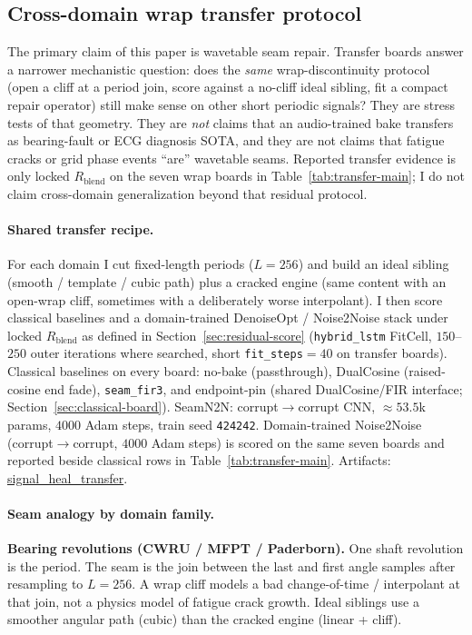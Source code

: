 
\subsection{Cross-domain wrap transfer protocol}
\label{sec:transfer-protocol}

The primary claim of this paper is wavetable seam repair.
Transfer boards answer a narrower mechanistic question:
does the \emph{same} wrap-discontinuity protocol (open a cliff at a period join, score against a no-cliff ideal sibling, fit a compact repair operator) still make sense on other short periodic signals?
They are stress tests of that geometry.
They are \emph{not} claims that an audio-trained bake transfers as bearing-fault or ECG diagnosis SOTA,
and they are not claims that fatigue cracks or grid phase events ``are'' wavetable seams.
Reported transfer evidence is only locked $R_{\mathrm{blend}}$ on the seven wrap boards in Table~\ref{tab:transfer-main}; I do not claim cross-domain generalization beyond that residual protocol.

\paragraph{Shared transfer recipe.}
For each domain I cut fixed-length periods ($L{=}256$) and build an ideal sibling (smooth / template / cubic path) plus a cracked engine (same content with an open-wrap cliff, sometimes with a deliberately worse interpolant).
I then score classical baselines and a domain-trained DenoiseOpt / Noise2Noise stack under locked $R_{\mathrm{blend}}$ as defined in Section~\ref{sec:residual-score}
(\texttt{hybrid\_lstm} FitCell, $150$--$250$ outer iterations where searched, short \texttt{fit\_steps}${}={}40$ on transfer boards).
Classical baselines on every board: no-bake (passthrough), DualCosine (raised-cosine end fade), \texttt{seam\_fir3}, and endpoint-pin (shared DualCosine/FIR interface; Section~\ref{sec:classical-board}).
SeamN2N: corrupt$\to$corrupt CNN, ${\approx}53.5$k params, $4000$ Adam steps, train seed \texttt{424242}.
Domain-trained Noise2Noise (corrupt$\to$corrupt, $4000$ Adam steps) is scored on the same seven boards and reported beside classical rows in Table~\ref{tab:transfer-main}.
Artifacts:
\href{https://github.com/reeldemo/denoise-opt}{signal\_heal\_transfer}.

\paragraph{Seam analogy by domain family.}
\textbf{Bearing revolutions (CWRU / MFPT / Paderborn).}
One shaft revolution is the period.
The seam is the join between the last and first angle samples after resampling to $L{=}256$.
A wrap cliff models a bad change-of-time / interpolant at that join, not a physics model of fatigue crack growth.
Ideal siblings use a smoother angular path (cubic) than the cracked engine (linear + cliff).

